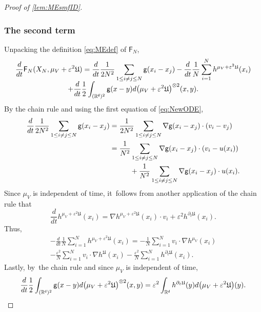 \documentclass[JEP,XML,SOM,Unicode,published]{cedram}
\theoremstyle{plain}
\theoremstyle{definition}
\DeclarePairedDelimiter{\pa}{\lparen}{\rparen}
\newcommand{\R}{{\mathbb{R}}}
\let\vep\varepsilon
\let\p\partial
\let\ux X
\newcommand{\Uu}{\mathfrak{U}}
\newcommand{\Fr}{\mathsf{F}}
\renewcommand{\d}{\mathsf{d}}
\newcommand{\g}{{\mathsf{g}}}
\begin{document}
\begin{proof}[Proof of \cref{lem:MEsmfID}]
\subsubsection*{The second term} Unpacking the definition \eqref{eq:MEdef} of $\Fr_N$,\vspace*{-5pt}
\begin{multline*}
\frac{d}{dt} \Fr_N(\ux_N, \mu_V + \vep^2\Uu) = \frac{d}{dt}\frac{1}{2N^2}\sum_{1\leq i\neq j\leq N}\g(x_i-x_j) - \frac{d}{dt}\frac{1}{N}\sum_{i=1}^N h^{\mu_V + \vep^2\Uu}(x_i) \\[-5pt]
+ \frac{d}{dt} \frac{1}{2}\int_{(\R^\d)^2} \g(x-y) d\pa*{\mu_V+\vep^2\Uu}^{\otimes 2}(x,y).
\end{multline*}
By the chain rule and using the first equation of \eqref{eq:NewODE},\vspace*{-5pt}
\begin{equation}
\label{eq:dtFcon1}
\begin{aligned}
\frac{d}{dt}\frac{1}{2N^2}\sum_{1\leq i\neq j\leq N}\g(x_i-x_j) &= \frac{1}{2N^2}\sum_{1\leq i\neq j\leq N} \nabla\g(x_i-x_j)\cdot\pa*{v_i-v_j}\\
&= \frac{1}{N^2}\sum_{1\leq i\neq j\leq N} \nabla\g(x_i-x_j)\cdot \pa*{v_i - u(x_i)}\\
&\hspace*{1cm}+ \frac{1}{N^2}\sum_{1\leq i\neq j\leq N}\nabla\g(x_i-x_j)\cdot u(x_i). 
\end{aligned}
\end{equation}
Since $\mu_V$ is independent of time, it~follows from another application of the chain rule that\vspace*{-5pt}
\begin{equation*}
\frac{d}{dt}h^{\mu_V + \vep^2\Uu}(x_i) = \nabla h^{\mu_V+\vep^2\Uu}(x_i)\cdot v_i + \vep^2 h^{\p_t\Uu}(x_i).
\end{equation*}
Thus,\vspace*{-5pt}
\begin{multline}\label{eq:dtFcon2}
- \frac{d}{dt}\frac{1}{N}\sum_{i=1}^N h^{\mu_V + \vep^2\Uu}(x_i) = -\frac{1}{N}\sum_{i=1}^N v_i\cdot\nabla h^{\mu_V}(x_i) \\[-8pt]
- \frac{\vep^2}{N}\sum_{i=1}^N v_i \cdot \nabla h^{\Uu}(x_i) - \frac{\vep^2}{N}\sum_{i=1}^N h^{\p_t\Uu}(x_i).
\end{multline}
Lastly, by~the chain rule and since $\mu_V$ is independent of time,\vspace*{-3pt}
\begin{equation}\label{eq:dtFcon3}
\frac{d}{dt} \frac{1}{2}\int_{(\R^\d)^2} \g(x-y) d\pa*{\mu_V+\vep^2\Uu}^{\otimes 2}(x,y) = \vep^2\int_{\R^\d} h^{\p_t\Uu}(y)d\pa*{\mu_V+\vep^2\Uu}(y).

\end{equation}
\end{proof}
\end{document}
